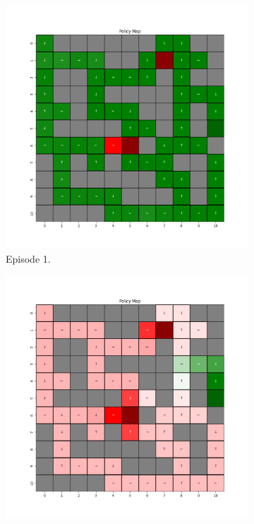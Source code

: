 \documentclass{assignment}
\begin{document}
\begin{figure}[H]
    \begin{subfigure}{0.3\textwidth}
        \includegraphics[width=\textwidth]{figures/policy_td/default/policy_alpha_0.1_gamma_0.95_epsilon_0.2_iteration_1.png}
    \caption{Episode 1.}
    \end{subfigure}\hfill
    \begin{subfigure}{0.3\textwidth}
        \includegraphics[width=\textwidth]{figures/policy_td/default/policy_alpha_0.1_gamma_0.95_epsilon_0.2_iteration_50.png}

\end{subfigure}
\end{figure}
\end{document}

